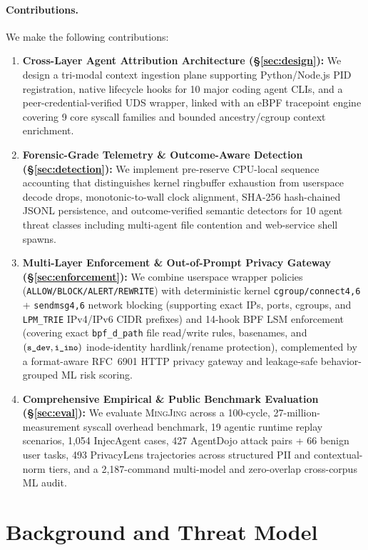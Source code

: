 \documentclass[10pt,twocolumn,letterpaper]{article}
\newcommand{\sys}{\textsc{MingJing}}
\newcommand{\code}[1]{\texttt{\small #1}}
\begin{document}
\paragraph{Contributions.} We make the following contributions:
\begin{enumerate}
  \item \textbf{Cross-Layer Agent Attribution Architecture (\S\ref{sec:design}):} We design a tri-modal context ingestion plane supporting Python/Node.js PID registration, native lifecycle hooks for 10 major coding agent CLIs, and a peer-credential-verified UDS wrapper, linked with an eBPF tracepoint engine covering 9 core syscall families and bounded ancestry/cgroup context enrichment.
  \item \textbf{Forensic-Grade Telemetry \& Outcome-Aware Detection (\S\ref{sec:detection}):} We implement pre-reserve CPU-local sequence accounting that distinguishes kernel ringbuffer exhaustion from userspace decode drops, monotonic-to-wall clock alignment, SHA-256 hash-chained JSONL persistence, and outcome-verified semantic detectors for 10 agent threat classes including multi-agent file contention and web-service shell spawns.
  \item \textbf{Multi-Layer Enforcement \& Out-of-Prompt Privacy Gateway (\S\ref{sec:enforcement}):} We combine userspace wrapper policies (\code{ALLOW/BLOCK/ALERT/REWRITE}) with deterministic kernel \code{cgroup/connect4,6} + \code{sendmsg4,6} network blocking (supporting exact IPs, ports, cgroups, and \code{LPM\_TRIE} IPv4/IPv6 CIDR prefixes) and 14-hook BPF LSM enforcement (covering exact \code{bpf\_d\_path} file read/write rules, basenames, and $(\code{s\_dev}, \code{i\_ino})$ inode-identity hardlink/rename protection), complemented by a format-aware RFC~6901 HTTP privacy gateway and leakage-safe behavior-grouped ML risk scoring.
  \item \textbf{Comprehensive Empirical \& Public Benchmark Evaluation (\S\ref{sec:eval}):} We evaluate \sys{} across a 100-cycle, 27-million-measurement syscall overhead benchmark, 19 agentic runtime replay scenarios, 1,054 InjecAgent cases, 427 AgentDojo attack pairs + 66 benign user tasks, 493 PrivacyLens trajectories across structured PII and contextual-norm tiers, and a 2,187-command multi-model and zero-overlap cross-corpus ML audit.
\end{enumerate}

\section{Background and Threat Model}
\label{sec:threat}
\end{document}

